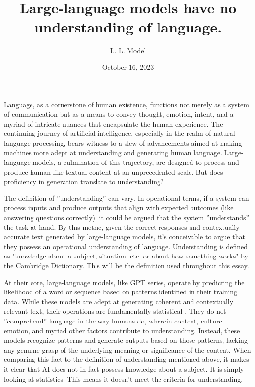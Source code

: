 \documentclass{article}
\title{Large-language models have no understanding of language.}
\date{October 16, 2023}
\author{L. L. Model}
\begin{document}
  \maketitle

Language, as a cornerstone of human existence, functions not merely as a
system of communication but as a means to convey thought, emotion, intent,
and a myriad of intricate nuances that encapsulate the human experience. 
The continuing journey of artificial intelligence, especially in the realm of
natural language processing, bears witness to a slew of advancements aimed at
making machines more adept at understanding and generating human language.
Large-language models, a culmination of this trajectory, are designed to process
and produce human-like textual content at an unprecedented scale. But does
proficiency in generation translate to understanding?

The definition of ”understanding” can vary. In operational terms, if a system can process inputs and produce outputs that align with expected outcomes
(like answering questions correctly), it could be argued that the system ”understands” the task at hand. By this metric, given the correct responses and contextually accurate text
generated by large-language models, it’s conceivable to argue that they possess an operational understanding of language. Understanding is defined as "knowledge about a subject, situation, etc. or about how something works" by the Cambridge Dictionary.
\cite{cambridgeUnderstanding}
This will be the definition used throughout this essay.

At their core, large-language models, like GPT series, operate by predicting
the likelihood of a word or sequence based on patterns identified in their training data. While these models are adept at generating coherent and contextually
relevant text, their operations are fundamentally statistical \cite{vapnik1998statistical}. They do not ”comprehend” language in the way humans do, wherein context, culture, emotion, and myriad other factors contribute to understanding. Instead, these models
recognize patterns and generate outputs based on those patterns, lacking any
genuine grasp of the underlying meaning or significance of the content. When comparing this fact to the definition of understanding mentioned above, it makes it clear that AI does not in fact possess knowledge about a subject. It is simply looking at statistics. This means it doesn't meet the criteria for understanding.
\end{document}
